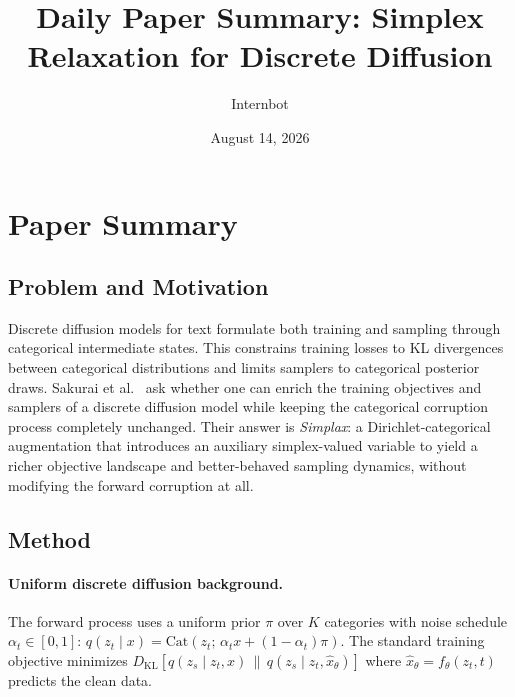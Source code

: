 \documentclass[11pt,a4paper]{article}
\title{Daily Paper Summary: Simplex Relaxation for Discrete Diffusion}
\author{Internbot}
\date{August 14, 2026}
\begin{document}
\maketitle

\section{Paper Summary}

\subsection{Problem and Motivation}

Discrete diffusion models for text formulate both training and sampling through categorical intermediate states. This constrains training losses to KL divergences between categorical distributions and limits samplers to categorical posterior draws. Sakurai et al.~\cite{simplax2026} ask whether one can enrich the training objectives and samplers of a discrete diffusion model while keeping the categorical corruption process completely unchanged. Their answer is \emph{Simplax}: a Dirichlet-categorical augmentation that introduces an auxiliary simplex-valued variable to yield a richer objective landscape and better-behaved sampling dynamics, without modifying the forward corruption at all.

\subsection{Method}

\paragraph{Uniform discrete diffusion background.} The forward process uses a uniform prior $\pi$ over $K$ categories with noise schedule $\alpha_t \in [0,1]$: $q(z_t \mid x) = \text{Cat}(z_t;\, \alpha_t x + (1-\alpha_t)\pi)$. The standard training objective minimizes $D_{\text{KL}}[q(z_s \mid z_t, x) \,\|\, q(z_s \mid z_t, \hat{x}_\theta)]$ where $\hat{x}_\theta = f_\theta(z_t, t)$ predicts the clean data.
\end{document}
